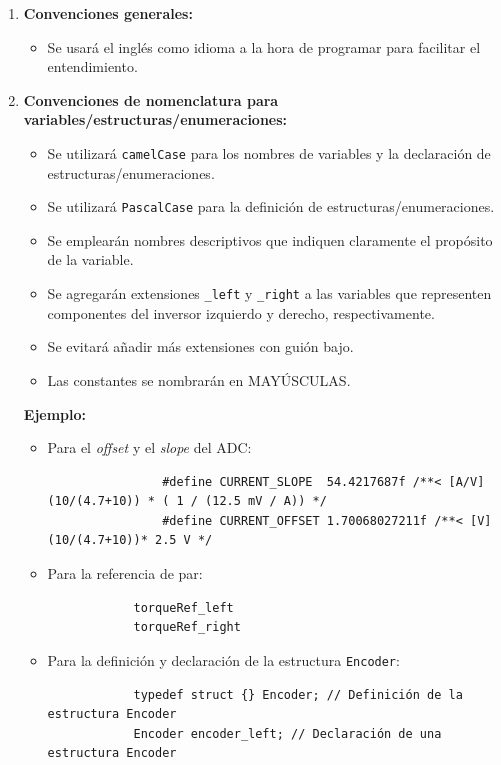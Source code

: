 \begin{enumerate}
	\item \textbf{Convenciones generales:}
	\begin{itemize}
		\item Se usará el inglés como idioma a la hora de programar para facilitar el entendimiento.
	\end{itemize}
	\item \textbf{Convenciones de nomenclatura para variables/estructuras/enumeraciones:}
	\begin{itemize}
		\item Se utilizará \texttt{camelCase} para los nombres de variables y la declaración de estructuras/enumeraciones.
		\item Se utilizará \texttt{PascalCase} para la definición de estructuras/enumeraciones.
		\item Se emplearán nombres descriptivos que indiquen claramente el propósito de la variable.
		\item Se agregarán extensiones \texttt{\_left} y \texttt{\_right} a las variables que representen componentes del inversor izquierdo y derecho, respectivamente.
		\item Se evitará añadir más extensiones con guión bajo.
		\item Las constantes se nombrarán en MAYÚSCULAS.
	\end{itemize}
	\textbf{Ejemplo:}
	\begin{itemize}
		\item Para el \textit{offset} y el \textit{slope} del ADC:
		{\small\begin{verbatim}
				#define CURRENT_SLOPE  54.4217687f /**< [A/V] (10/(4.7+10)) * ( 1 / (12.5 mV / A)) */
				#define CURRENT_OFFSET 1.70068027211f /**< [V] (10/(4.7+10))* 2.5 V */
		\end{verbatim}}
		\item Para la referencia de par:
		\begin{verbatim}
			torqueRef_left
			torqueRef_right
		\end{verbatim}
		\item Para la definición y declaración de la estructura \texttt{Encoder}:
		\begin{verbatim}
			typedef struct {} Encoder; // Definición de la estructura Encoder
			Encoder encoder_left; // Declaración de una estructura Encoder
		\end{verbatim}
		

\end{itemize}
\end{enumerate}
